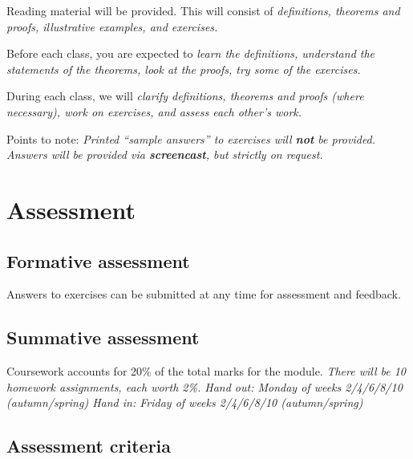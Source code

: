 Reading material will be provided. This will consist of
\ben
\it definitions,
\it theorems and proofs,
\it illustrative examples, and
\it exercises.
\een

\newpage
Before each class, you are expected to
\ben
\it learn the definitions,
\it understand the statements of the theorems,
\it look at the proofs,
\it try some of the exercises.
\een

During each class, we will
\ben
\it clarify definitions, theorems and proofs (where necessary),
\it work on exercises, and
\it assess each other's work.
\een

Points to note:
\bit
\it Printed ``sample answers'' to exercises will \textbf{not} be provided.
\it Answers will be provided via \textbf{screencast}, but strictly on request.
\eit

\section{Assessment}

\subsection{Formative assessment}
Answers to exercises can be submitted at any time for assessment and feedback.

\subsection{Summative assessment}
Coursework accounts for 20\% of the total marks for the module.
\bit
\it There will be 10 homework assignments, each worth 2\%.
\it Hand out:	Monday of weeks 2/4/6/8/10 (autumn/spring)
\it Hand in:		Friday of weeks 2/4/6/8/10 (autumn/spring)
\eit

\subsection{Assessment criteria}


